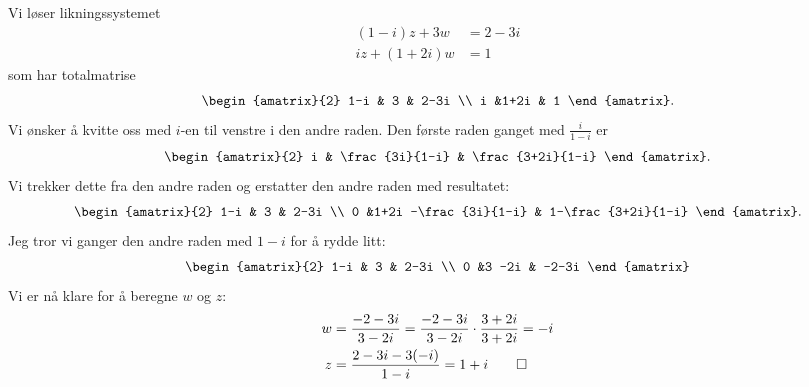 \begin{ex}
Vi løser likningssystemet
\begin{align*}
(1-i) z + 3w   &= 2-3i \\
i z + (1+2i) w &= 1
\end{align*}
som har totalmatrise
\[
\begin{amatrix}{2}
1-i & 3 & 2-3i \\ i &1+2i & 1
\end{amatrix}.
\]
Vi ønsker å kvitte oss med $i$-en til venstre i den andre raden. 
Den første raden ganget  med $\frac{i}{1-i}$ er
\[
\begin{amatrix}{2}
i & \frac{3i}{1-i} & \frac{3+2i}{1-i} 
\end{amatrix}.
\]
Vi trekker dette fra den andre raden og erstatter den andre raden med resultatet:
\[
\begin{amatrix}{2}
1-i & 3 & 2-3i \\ 0 &1+2i -\frac{3i}{1-i} & 1-\frac{3+2i}{1-i} 
\end{amatrix}.
\]
Jeg tror vi ganger den andre raden med $1-i$ for å rydde litt:
\[
\begin{amatrix}{2}
1-i & 3 & 2-3i \\ 0 &3 -2i  & -2-3i
\end{amatrix}
\]
Vi er nå klare for å beregne $w$ og $z$:
\begin{align*}
w&=\frac{-2-3i}{3-2i}=\frac{-2-3i}{3-2i}\cdot \frac{3+2i}{3+2i}=-i \\
z&=\frac{2-3i-3(-i)}{1-i}=1+i \qedhere
\end{align*}
\end{ex}


